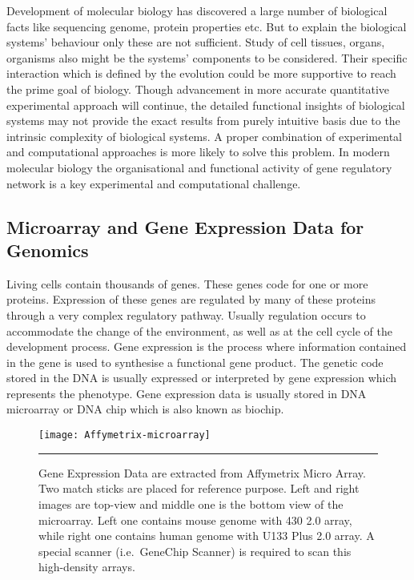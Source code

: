 Development of molecular biology has discovered a large number of biological facts like sequencing genome, protein properties etc. But to explain the biological systems' behaviour only these are not sufficient. Study of cell tissues, organs, organisms also might be the systems' components to be  considered. Their specific interaction which is defined by the evolution could be more supportive to reach the prime goal of biology. Though advancement in more accurate quantitative experimental approach will continue, the detailed functional insights of biological systems may not provide the exact results from purely intuitive basis due to the intrinsic complexity of biological systems. A proper combination of experimental and computational approaches is more likely to solve this problem. In modern molecular biology the organisational and functional activity of gene regulatory network is a key experimental and computational challenge.

\subsection{Microarray and Gene Expression Data for Genomics }
Living cells contain thousands of genes. These genes code for one or more proteins. Expression of these genes are regulated by many of these proteins through a very complex regulatory pathway. Usually regulation occurs to accommodate the change of the environment, as well as at the cell cycle of the development process. %
Gene expression is the process where information contained in the gene is used to synthesise a functional gene product. The genetic code stored in the DNA is usually expressed or interpreted by gene expression which represents the  phenotype. Gene expression data is usually stored in DNA microarray or DNA chip which is also known as biochip. 

\begin{figure}[t]
	\centering
	\texttt{[image: Affymetrix-microarray]}
		\rule{35em}{0.5pt}
	\caption[Affymetrix Micro Array]{Gene Expression Data are extracted from Affymetrix Micro Array. Two match sticks are placed for reference purpose. Left and right images are top-view and middle one is the bottom view of the microarray. Left one contains mouse genome with 430 2.0 array, while right one contains human genome with U133 Plus 2.0 array. A special scanner (i.e.\ GeneChip Scanner) is required to scan this high-density arrays.}
	\label{fig:Affymetrix-microarray}
\end{figure}
 
